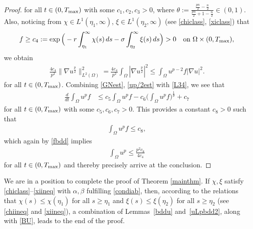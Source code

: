 \documentclass[12pt,reqno,draft]{article}
\numberwithin{equation}{section}
\theoremstyle{theorem}
\theoremstyle{definition}
\newcommand{\Tmax}{T_{\rm max}}
\begin{document}
\begin{proof}
% 
 for all $t \in (0, \Tmax)$ with some $c_1, c_2, c_3>0$, where 
 $\theta:=\frac{\frac{pn}{2}-\frac{n}{2}}{\frac{pn}{2}+1-\frac{n}{2}} \in (0,1)$. 
 Also, noticing from $\chi \in L^1(\eta_1, \infty)$, $\xi \in L^1(\eta_2,\infty)$
 (see \eqref{chiclass}, \eqref{xiclass}) that 
%
    \begin{align}\label{fbdd}
             f \ge c_4
              :=\exp\Big(-r\int_{\eta_1}^\infty \chi(s)\,ds
                              -\sigma\int_{\eta_2}^\infty \xi(s)\,ds
                        \Big)>0
    \quad
             {\rm on}\ \Omega \times (0, \Tmax),
    \end{align}
%  
 we obtain 
\begin{align}\label{up/2est}
\frac{4c_4}{p^2}\|\nabla u^{\frac{p}{2}}\|_{L^2(\Omega)}^{2}=\frac{4c_4}{p^2}\int_\Omega |\nabla u^{\frac{p}{2}}|^2
\le \int_\Omega u^{p-2}f|\nabla u|^2.
\end{align}
for all $t \in (0, \Tmax)$. 
Combining \eqref{GNest}, \eqref{up/2est} with \eqref{L34}, we see that
%
\begin{align*}%
               \frac{d}{dt}\int_\Omega u^pf
        &\le c_5\int_\Omega u^pf
               -c_6\Big(\int_\Omega u^p f\Big)^{\frac{1}{\theta}}+c_7
    \end{align*}
% 
for all $t \in (0, \Tmax)$  with some $c_5, c_6, c_7>0$. 
 This provides 
 a constant $c_8>0$ such that 
%
    \begin{align*}
             \int_\Omega u^pf \le c_8,
    \end{align*}
%  
which again by \eqref{fbdd} implies
%
    \begin{align*}
             \int_\Omega u^p \le \frac{p^2c_8}{4c_4}
    \end{align*}
% 
for all $t \in (0, \Tmax)$ 
 and thereby precisely arrive at the conclusion.
\end{proof}
\vspace{5mm}

 We are in a position to complete the proof of Theorem \ref{mainthm}.
 If $\chi, \xi$ satisfy \eqref{chiclass}--\eqref{xiineq} 
 with $\alpha, \beta$ fulfilling \eqref{condiab}, 
 then, according to the relations that $\chi(s) \le \chi(\eta_1)$ for all $s \ge \eta_1$ and $\xi(s) \le \xi(\eta_2)$ for all $s \ge \eta_2$
 (see \eqref{chiineq} and \eqref{xiineq}), 
 a combination of 
 Lemmas~\ref{bddu} and~\ref{uLpbdd2}, along 
 with \eqref{BU}, leads to the end of the proof.
\end{document}
